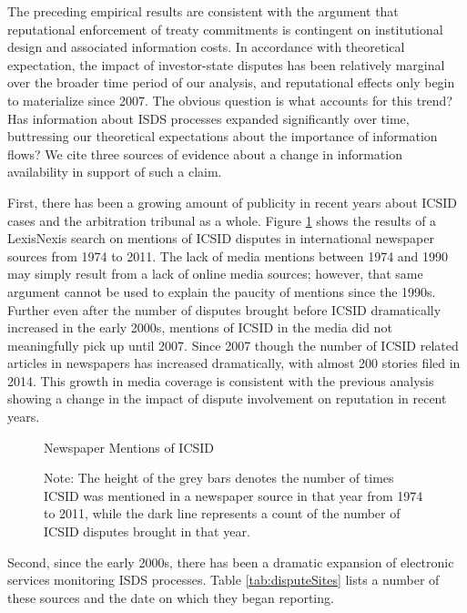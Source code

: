 \documentclass[12pt,onesided]{amsart}
\begin{document}

The preceding empirical results are consistent with the argument that reputational enforcement of treaty commitments is contingent on institutional design and associated information costs. In accordance with theoretical expectation, the impact of investor-state disputes has been relatively marginal over the broader time period of our analysis, and reputational effects only begin to materialize since 2007. The obvious question is what accounts for this trend? Has information about ISDS processes expanded significantly over time, buttressing our theoretical expectations about the importance of information flows? We cite three sources of evidence about a change in information availability in support of such a claim. 

First, there has been a growing amount of publicity in recent years about ICSID cases and the arbitration tribunal as a whole. Figure \ref{fig:icsidMedia} shows the results of a LexisNexis search on mentions of ICSID disputes in international newspaper sources from 1974 to 2011. The lack of media mentions between 1974 and 1990 may simply result from a lack of online media sources; however, that same argument cannot be used to explain the paucity of mentions since the 1990s. Further even after the number of disputes brought before ICSID dramatically increased in the early 2000s, mentions of ICSID in the media did not meaningfully pick up until 2007. Since 2007 though the number of ICSID related articles in newspapers has increased dramatically, with almost 200 stories filed in 2014. This growth in media coverage is consistent with the previous analysis showing a change in the impact of dispute involvement on reputation in recent years.

\begin{figure}[ht]
	\vspace{4cm}
	\centering
	\caption{Newspaper Mentions of ICSID}
	\label{fig:icsidMedia}
	\resizebox{1\textwidth}{!}{}
	\caption*{Note: The height of the grey bars denotes the number of times ICSID was mentioned in a newspaper source in that year from 1974 to 2011, while the dark line represents a count of the number of ICSID disputes brought in that year.}
\end{figure}
\FloatBarrier

Second, since the early 2000s, there has been a dramatic expansion of electronic services monitoring ISDS processes. Table \ref{tab:disputeSites} lists a number of these sources and the date on which they began reporting. 
\end{document}
